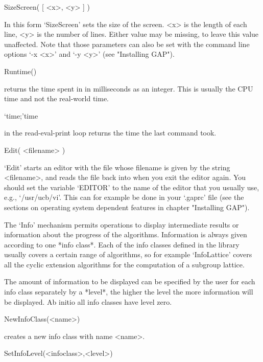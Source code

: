 \>SizeScreen( [ <x>, <y> ] )

In this form `SizeScreen' sets the size of the screen. <x> is the length
of each line, <y> is the number of lines. Either value may be missing,
to leave this value unaffected. Note that those parameters can also be
set with the command line options `-x <x>' and `-y <y>' (see "Installing GAP").


\>Runtime()

returns the time spent in {\GAP} in milliseconds as an integer. This is
usually the CPU time and not the real-world time.

\>`time;'{time}

in the read-eval-print loop returns the time the last command took.


\>Edit( <filename> )

`Edit' starts an editor with the file whose filename is given by the
string <filename>, and reads the file back into {\GAP} when you exit the
editor again. You should set the {\GAP} variable `EDITOR' to the name of
the editor that you usually use, e.g., `/usr/ucb/vi'. This can for
example be done in your `.gaprc' file (see the sections on operating
system dependent features in chapter "Installing GAP").


The `Info' mechanism permits operations to display intermediate results or
information about the progress of the algorithms.
Information is always given according to one *info class*. Each of the
info classes defined in the {\GAP} library usually covers a certain range
of algorithms, so for example `InfoLattice' covers all the cyclic extension
algorithms for the computation of a subgroup lattice.

The amount of information to be displayed can be specified by the user for
each info class separately by a *level*, the higher the level the more
information will be displayed.
Ab initio all info classes have level zero.

\>NewInfoClass(<name>)

creates a new info class with name <name>.

\>SetInfoLevel(<infoclass>,<level>)

